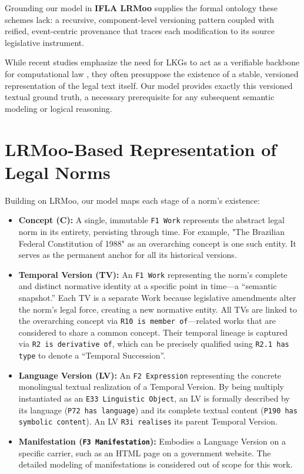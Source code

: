 \documentclass[11pt]{article}
\begin{document}
Grounding our model in \textbf{IFLA LRMoo} supplies the formal ontology these schemes lack: a recursive, component-level versioning pattern coupled with reified, event-centric provenance that traces each modification to its source legislative instrument.

While recent studies emphasize the need for LKGs to act as a verifiable backbone 
for computational law \cite{boer2020legal,gangemi2005constructive}, they often presuppose the existence of a stable, versioned representation of the legal text itself. Our model provides exactly this versioned textual ground truth, a necessary prerequisite for any subsequent semantic modeling or logical reasoning.

\section{LRMoo-Based Representation of Legal Norms}
\label{legal_norm_representation}
Building on LRMoo, our model maps each stage of a norm's existence:
\begin{itemize}
    \item \textbf{Concept (C):} A single, immutable \texttt{F1 Work} represents the abstract legal norm in its entirety, persisting through time. For example, "The Brazilian Federal Constitution of 1988" as an overarching concept is one such entity. It serves as the permanent anchor for all its historical versions.

    \item \textbf{Temporal Version (TV):} An \texttt{F1 Work} representing the norm’s complete and distinct normative identity at a specific point in time—a ``semantic snapshot.'' Each TV is a separate Work because legislative amendments alter the norm's legal force, creating a new normative entity. All TVs are linked to the overarching concept via \texttt{R10 is member of}---related works that are considered to share a common concept. Their temporal lineage is captured via \texttt{R2 is derivative of}, which can be precisely qualified using \texttt{R2.1 has type} to denote a ``Temporal Succession''.

    \item \textbf{Language Version (LV):} An \texttt{F2 Expression} representing the concrete monolingual textual realization of a Temporal Version. By being multiply instantiated as an \texttt{E33 Linguistic Object}, an LV is formally described by its language (\texttt{P72 has language}) and its complete textual content (\texttt{P190 has symbolic content}). An LV \texttt{R3i realises} its parent Temporal Version.
     
    \item \textbf{Manifestation (\texttt{F3 Manifestation}):} Embodies a Language Version on a specific carrier, such as an HTML page on a government website. The detailed modeling of manifestations is considered out of scope for this work.
\end{itemize}
\end{document}
